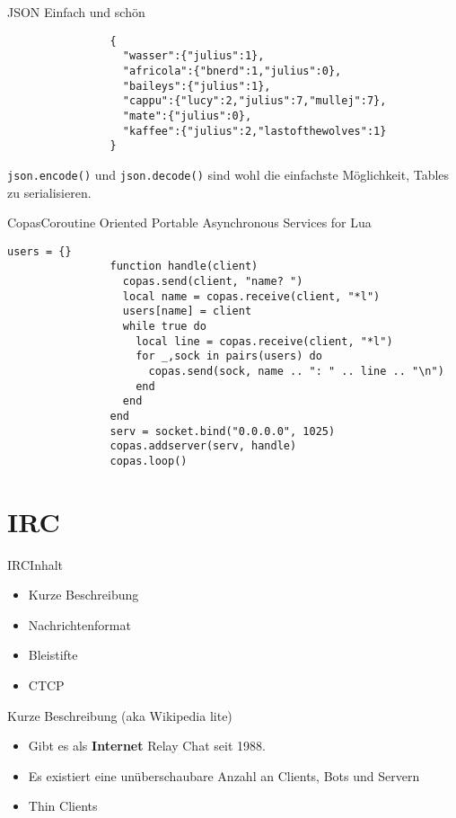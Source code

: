 \documentclass{beamer}
\begin{document}
		\begin{frame}[fragile]{JSON}
			Einfach und schön

			\begin{lstlisting}
				{
				  "wasser":{"julius":1},
				  "africola":{"bnerd":1,"julius":0},
				  "baileys":{"julius":1},
				  "cappu":{"lucy":2,"julius":7,"mullej":7},
				  "mate":{"julius":0},
				  "kaffee":{"julius":2,"lastofthewolves":1}
				}
			\end{lstlisting}
			\verb+json.encode()+ und \verb+json.decode()+ sind wohl die einfachste Möglichkeit, Tables zu serialisieren.
		\end{frame}
		
		\begin{frame}[fragile,shrink=5]{Copas}{Coroutine Oriented Portable Asynchronous Services for Lua}
			\lstset{numbers=left}

			\begin{lstlisting}[title={Primitiver Chatserver},firstnumber=3,frame=single]
				users = {}
				function handle(client)
				  copas.send(client, "name? ")
				  local name = copas.receive(client, "*l")
				  users[name] = client
				  while true do
				    local line = copas.receive(client, "*l")
				    for _,sock in pairs(users) do
				      copas.send(sock, name .. ": " .. line .. "\n")
				    end
				  end
				end
				serv = socket.bind("0.0.0.0", 1025)
				copas.addserver(serv, handle)
				copas.loop()
			\end{lstlisting}
		\end{frame}
	
	
	\section{IRC}
		\begin{frame}{IRC}{Inhalt}
			\begin{itemize}
				\item Kurze Beschreibung 
				\item Nachrichtenformat
				\item Bleistifte
				\item CTCP
			\end{itemize}
		\end{frame}
		
		\begin{frame}{Kurze Beschreibung (aka Wikipedia lite)}
			\begin{itemize}
				\item Gibt es als \textbf{Internet} Relay Chat seit 1988.
				\item Es existiert eine unüberschaubare Anzahl an Clients, Bots und Servern
				\item Thin Clients
			\end{itemize}
		\end{frame}
		
\end{document}

